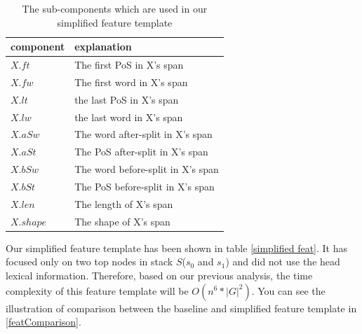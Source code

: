 \begin{table}
	\caption{\label{simplified subcomp} The sub-components which are used in our simplified feature template}
	\begin{center}
		\begin{tabular}{|l|l|}
			\hline 
			component & explanation \\ 
			\hline
			$X.ft$ &  The first PoS in X's span \\
			$X.fw$ &  The first word in X's span \\
			$X.lt$ &  the last PoS in X's span \\
			$X.lw$ &  the last word in X's span \\
			$X.aSw$ &  The word after-split in X's span \\
			$X.aSt$ &  The PoS after-split in X's span \\
			$X.bSw$ &  The word before-split in X's span \\
			$X.bSt$ &  The PoS before-split in X's span \\
			$X.len$ &  The length of X's span \\
			$X.shape$ &  The shape of X's span \\
			\hline
		\end{tabular}
	\end{center}
\end{table}

Our simplified feature template has been shown in table \ref{simplified feat}. It has focused only on two top nodes in stack $S$($s_0$ and $s_1$) and did not use the head lexical information. Therefore, based on our previous analysis, the time complexity of this feature template will be $O(n^6*|G|^2)$. You can see the illustration of comparison between the baseline and simplified feature template in \ref{featComparison}.

